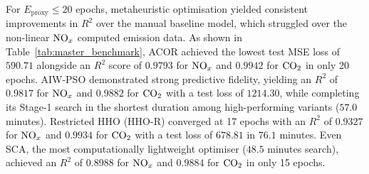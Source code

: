 \documentclass[runningheads]{llncs}
\begin{document}
\begin{table}[t]
	\centering
	\caption{Comprehensive Performance and Computational Comparison: Manual Baseline vs. Metaheuristic-Optimised Models}
	\label{tab:master_benchmark}
	\setlength{\tabcolsep}{4.5pt}
\end{table}

For $E_{\text{proxy}} \le 20$ epochs, metaheuristic optimisation yielded consistent improvements in $R^2$ over the
manual baseline model, which struggled over the non-linear $\ce{NO_x}$ computed emission data. As shown in
Table~\ref{tab:master_benchmark},
ACOR achieved the lowest test MSE loss of $590.71$ alongside an $R^2$ score of $0.9793$ for
$\ce{NO_x}$ and $0.9942$ for $\ce{CO2}$
in only 20 epochs. AIW-PSO demonstrated strong predictive fidelity, yielding an
$R^2$ of $0.9817$ for $\ce{NO_x}$ and $0.9882$ for $\ce{CO2}$ with a test loss of $1214.30$, while
completing its Stage-1 search in the shortest duration among high-performing variants ($57.0$
minutes). Restricted HHO (HHO-R) converged at 17 epochs with an $R^2$ of $0.9327$ for $\ce{NO_x}$
and $0.9934$ for $\ce{CO2}$ with a test loss of $678.81$ in $76.1$ minutes. Even SCA, the most
computationally lightweight
optimiser ($48.5$ minutes search), achieved an $R^2$ of $0.8988$ for $\ce{NO_x}$ and $0.9884$ for
$\ce{CO2}$ in only 15 epochs.
\end{document}
